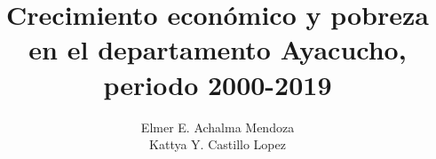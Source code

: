 \thispagestyle{empty}
\title{Crecimiento económico y pobreza en el departamento Ayacucho, periodo 2000-2019}
\author{Elmer E. Achalma Mendoza \\Kattya Y. Castillo Lopez} %


